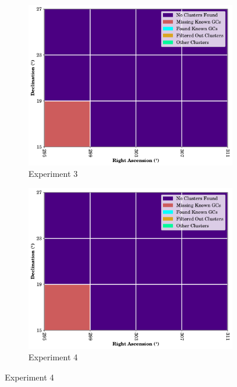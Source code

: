 \begin{figure}[H]
    \begin{subfigure}[b]{0.49\textwidth}
        \includegraphics[width=\textwidth]{./figures/rasters/grids/grid-run-03-a2-4x4.pdf}
        \caption{Experiment 3}
    \end{subfigure}
    \begin{subfigure}[b]{0.49\textwidth}
        \includegraphics[width=\textwidth]{./figures/rasters/grids/grid-run-04-a2-4x4.pdf}
        \caption{Experiment 4}
    \end{subfigure}


\end{figure}
